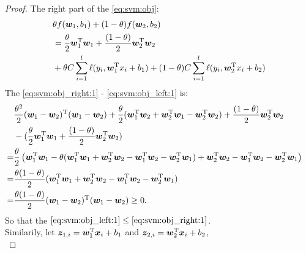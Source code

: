 \documentclass[a4paper]{article}
\begin{document}
{\begin{enumerate}
\begin{enumerate}
\begin{proof}
            The right part of the \eqref{eq:svm:obj}:
            \begin{subequations}\label{eq:svm:obj_right}
                \begin{align}
                &\theta f(\bm{w}_1,b_1)+(1-\theta)f(\bm{w}_2,b_2) \nonumber \\
                &=\frac{\theta}{2}\bm{w}_1^{\mathrm{T}}\bm{w}_1+\frac{(1-\theta)}{2}\bm{w}_2^{\mathrm{T}}\bm{w}_2 
                    \label{eq:svm:obj_right:1} \\
                &+\theta C\sum_{i=1}^{l}\ell(y_i,\bm{w}_1^{\mathrm{T}}x_i+b_1)+
                    (1-\theta)C\sum_{i=1}^{l}\ell(y_i,\bm{w}_2^{\mathrm{T}}x_i+b_2) \label{eq:svm:obj_right:2}
                \end{align}
            \end{subequations}
            The \eqref{eq:svm:obj_right:1} - \eqref{eq:svm:obj_left:1} is:
            \begin{equation*}
            \begin{aligned}
                &\frac{\theta^2}{2}(\bm{w}_1-\bm{w}_2)^{\mathrm{T}}(\bm{w}_1-\bm{w}_2)
                +\frac{\theta}{2}(\bm{w}_1^{\mathrm{T}}\bm{w}_2+\bm{w}_2^{\mathrm{T}}\bm{w}_1-\bm{w}_2^{\mathrm{T}}\bm{w}_2)
                    +\frac{(1-\theta)}{2}\bm{w}_2^{\mathrm{T}}\bm{w}_2 &\\
                &-(\frac{\theta}{2}\bm{w}_1^{\mathrm{T}}\bm{w}_1 +
                    \frac{(1-\theta)}{2}\bm{w}_2^{\mathrm{T}}\bm{w}_2)& \\
                =& \frac{\theta}{2}\left(\bm{w}_1^{\mathrm{T}}\bm{w}_1-\theta(\bm{w}_1^{\mathrm{T}}\bm{w}_1+\bm{w}_2^{\mathrm{T}}\bm{w}_2-
                    \bm{w}_1^{\mathrm{T}}\bm{w}_2-\bm{w}_2^{\mathrm{T}}\bm{w}_1)+
                    \bm{w}_2^{\mathrm{T}}\bm{w}_2-\bm{w}_1^{\mathrm{T}}\bm{w}_2-\bm{w}_2^{\mathrm{T}}\bm{w}_1\right) &\\
                =& \frac{\theta(1-\theta)}{2}(\bm{w}_1^{\mathrm{T}}\bm{w}_1+\bm{w}_2^{\mathrm{T}}\bm{w}_2
                    -\bm{w}_1^{\mathrm{T}}\bm{w}_2-\bm{w}_2^{\mathrm{T}}\bm{w}_1) &\\
                =& \frac{\theta(1-\theta)}{2}(\bm{w}_1-\bm{w}_2)^{\mathrm{T}}(\bm{w}_1-\bm{w}_2) \geq 0.&
            \end{aligned}
            \end{equation*}
            So that the $ \eqref{eq:svm:obj_left:1} \leq \eqref{eq:svm:obj_right:1}$.\\

            Similarily, let $\bm{z}_{1,i}=\bm{w}_1^{\mathrm{T}}\bm{x}_i+b_1$ and $\bm{z}_{2,i}=\bm{w}_2^{\mathrm{T}}\bm{x}_i+b_2$,\\


\end{proof}
\end{enumerate}
\end{enumerate}}
\end{document}
